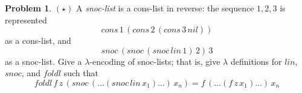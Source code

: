 \documentclass[10pt]{article}
\theoremstyle{definition}
\newtheorem{prob}{Problem}
\begin{document}
\begin{prob}
  $(\star)$ A \emph{snoc-list} is a cons-list in reverse: the sequence $1, 2, 3$ is represented
  \[
    cons\,1\,(cons\,2\,(cons\,3\,nil))
  \]
  as a cons-list, and
  \[
    snoc\,(snoc\,(snoc\,lin\,1)\,2)\,3
  \]
  as a snoc-list.  Give a $\lambda$-encoding of snoc-lists; that is, give $\lambda$ definitions for $lin$, $snoc$, and $foldl$ such that
  \[
    foldl\,f\,z\,(snoc\,(\dots(snoc\,lin\,x_1)\dots)\,x_n) = f\,(\dots(f\,z\,x_1)\dots)\,x_n
  \]
\end{prob}
\end{document}
